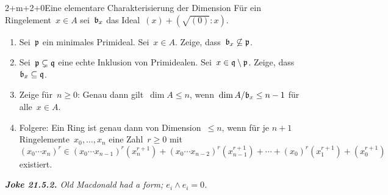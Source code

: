 \documentclass{uebblatt}
\begin{document}
\begin{aufgabe}{2+m+2+0}{Eine elementare Charakterisierung der Dimension}
Für ein Ringelement~$x \in A$ sei~$\mathfrak{b}_x$ das Ideal~$(x) + (\sqrt{(0)}:x)$.
\begin{enumerate}
\item Sei~$\mathfrak{p}$ ein minimales Primideal. Sei~$x \in A$. Zeige,
dass~$\mathfrak{b}_x \not\subseteq \mathfrak{p}$.
\item Sei~$\mathfrak{p} \subsetneq \mathfrak{q}$ eine echte Inklusion von Primidealen. Sei~$x
\in \mathfrak{q} \setminus \mathfrak{p}$. Zeige, dass~$\mathfrak{b}_x \subseteq \mathfrak{q}$.
\item Zeige für~$n \geq 0$: Genau dann gilt~$\dim A \leq n$, wenn~$\dim
A/\mathfrak{b}_x \leq n - 1$ für alle~$x \in A$.
\item Folgere: Ein Ring ist genau dann von Dimension~$\leq n$, wenn für
je $n+1$ Ringelemente~$x_0,\ldots,x_n$ eine Zahl~$r \geq 0$ mit
\[ (x_0 \cdots x_n)^r \in (x_0 \cdots x_{n-1})^r (x_n^{r+1}) +
  (x_0 \cdots x_{n-2})^r (x_{n-1}^{r+1}) + \cdots +
  (x_0)^r (x_1^{r+1}) + (x_0^{r+1}) \]
existiert.
\end{enumerate}
\end{aufgabe}

\centering
\emph{\textbf{Joke 21.5.2.} Old Macdonald had a form; $e_i \wedge e_i = 0$.}
\end{document}
